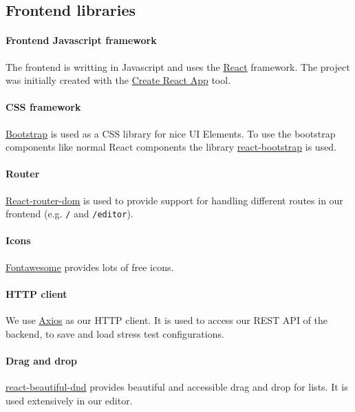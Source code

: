 \subsection{Frontend libraries}

\paragraph{Frontend Javascript framework}
The frontend is writting in Javascript and uses the \href{https://reactjs.org}{React} framework.
The project was initially created with the \href{https://create-react-app.dev}{Create React App} tool.

\paragraph{CSS framework}
\href{https://getbootstrap.com}{Bootstrap} is used as a CSS library for nice UI Elements. 
To use the bootstrap components like normal React components the library \href{https://react-bootstrap.github.io}{react-bootstrap} is used.

\paragraph{Router}
\href{https://reacttraining.com/react-router/web/guides/quick-start}{React-router-dom} is used to provide support for handling different routes in our frontend (e.g. \texttt{/} and \texttt{/editor}).

\paragraph{Icons}
\href{https://fontawesome.com}{Fontawesome} provides lots of free icons.

\paragraph{HTTP client}
We use \href{https://github.com/axios/axios}{Axios} as our HTTP client.
It is used to access our REST API of the backend, to save and load stress test configurations.

\paragraph{Drag and drop}
\href{https://github.com/atlassian/react-beautiful-dnd}{react-beautiful-dnd} provides beautiful and accessible drag and drop for lists.
It is used extensively in our editor.

